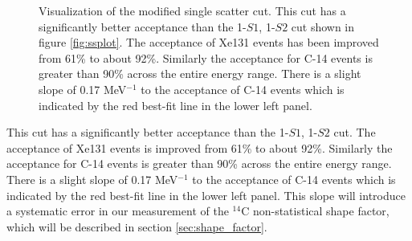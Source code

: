 {\begin{figure}[h!]
\begin{subfigure}{0.5\textwidth}
\end{subfigure}
\caption{Visualization of the modified single scatter cut. This cut has a significantly better acceptance than the 1-$S1$, 1-$S2$ cut shown in figure \ref{fig:ssplot}. The acceptance of Xe131 events has been improved from 61\% to about  92\%. Similarly the acceptance for C-14 events is greater than 90\% across the entire energy range. There is a slight slope of 0.17 MeV$^{-1}$ to the acceptance of C-14 events which is indicated by the red best-fit line in the lower left panel. }
\label{fig:ssplot_new}
\end{figure} 

This cut has a significantly better acceptance than the 1-$S1$, 1-$S2$ cut. The acceptance of Xe131 events is improved from 61\% to about  92\%. Similarly the acceptance for C-14 events is greater than 90\% across the entire energy range. There is a slight slope of 0.17 MeV$^{-1}$ to the acceptance of C-14 events which is indicated by the red best-fit line in the lower left panel. This slope will introduce a systematic error in our measurement of the $^{14}$C non-statistical shape factor, which will be described in section \ref{sec:shape_factor}. 

}
